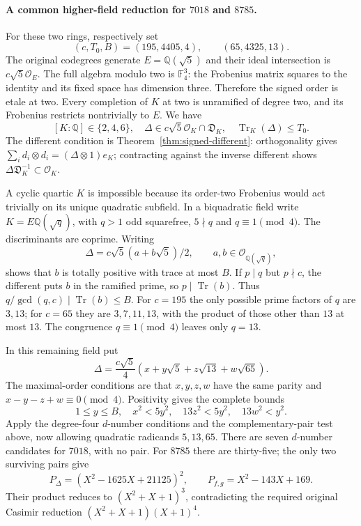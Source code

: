 \paragraph{A common higher-field reduction for $7018$ and $8785$.}
For these two rings, respectively set
\[
 (c,T_0,B)=(195,4405,4),\qquad(65,4325,13).
\]
The original codegrees generate $E=\mathbb Q(\sqrt5)$ and their ideal
intersection is $c\sqrt5\mathcal O_E$. The full algebra modulo two is
$\mathbb F_4^3$: the Frobenius matrix squares to the identity and its
fixed space has dimension three. Therefore the signed order is etale
at two. Every completion of $K$ at two is unramified of degree two,
and its Frobenius restricts nontrivially to $E$. We have
\[
 [K:\mathbb Q]\in\{2,4,6\},\quad
 \Delta\in c\sqrt5\mathcal O_K\cap\mathfrak D_K,\quad
 \operatorname{Tr}_K(\Delta)\le T_0.
\]
The different condition is Theorem~\ref{thm:signed-different}:
orthogonality gives $\sum_i d_i\otimes d_i=(\Delta\otimes1)e_K$;
contracting against the inverse different shows
$\Delta\mathfrak D_K^{-1}\subset\mathcal O_K$.

A cyclic quartic $K$ is impossible because its order-two Frobenius
would act trivially on its unique quadratic subfield. In a biquadratic
field write $K=E\mathbb Q(\sqrt q)$, with $q>1$ odd squarefree,
$5\nmid q$ and $q\equiv1\pmod4$. The discriminants are coprime.
Writing
\[
 \Delta=c\sqrt5(a+b\sqrt5)/2,\qquad a,b\in\mathcal O_{\mathbb Q(\sqrt q)},
\]
shows that $b$ is totally positive with trace at most $B$.
If $p\mid q$ but $p\nmid c$, the different puts $b$ in the ramified
prime, so $p\mid\operatorname{Tr}(b)$. Thus
$q/\gcd(q,c)\mid\operatorname{Tr}(b)\le B$.
For $c=195$ the only possible prime factors of $q$ are $3,13$;
for $c=65$ they are $3,7,11,13$, with the product of those other than
$13$ at most $13$. The congruence $q\equiv1\pmod4$ leaves only $q=13$.

In this remaining field put
\[
 \Delta=\frac{c\sqrt5}{4}
 (x+y\sqrt5+z\sqrt{13}+w\sqrt{65}).
\]
The maximal-order conditions are that $x,y,z,w$ have the same parity
and $x-y-z+w\equiv0\pmod4$. Positivity gives the complete bounds
\[
 1\le y\le B,\quad x^2<5y^2,\quad13z^2<5y^2,\quad13w^2<y^2.
\]
Apply the degree-four $d$-number conditions and the complementary-pair
test above, now allowing quadratic radicands $5,13,65$.
There are seven $d$-number candidates for $7018$, with no pair.
For $8785$ there are thirty-five; the only two surviving pairs give
\[
 P_\Delta=(X^2-1625X+21125)^2,\qquad P_{f,g}=X^2-143X+169.
\]
Their product reduces to $(X^2+X+1)^3$, contradicting the required
original Casimir reduction $(X^2+X+1)(X+1)^4$.

